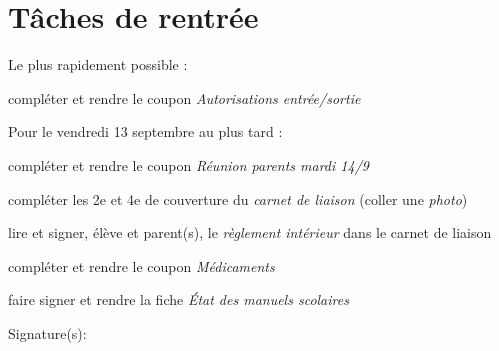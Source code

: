 \documentclass[10pt,a5paper]{article}
\begin{document}
\PfCPanneaux[FeuTricolore]
\section*{Tâches de rentrée}

Le plus rapidement possible :

\begin{todolist}
    \item compléter et rendre le coupon \emph{Autorisations entrée/sortie}
\end{todolist}

Pour le vendredi 13 septembre au plus tard :
\begin{todolist}
\item  compléter et rendre le coupon \emph{Réunion parents mardi 14/9}
\item  compléter les 2e et 4e de couverture du \emph{carnet de liaison} (coller une \emph{photo})
\item  lire et signer, élève et parent(s), le \emph{règlement intérieur} dans le carnet de liaison
\item  compléter et rendre le coupon \emph{Médicaments}
\item  faire signer et rendre la fiche \emph{État des manuels scolaires}
\end{todolist}
Signature(s):
\end{document}
